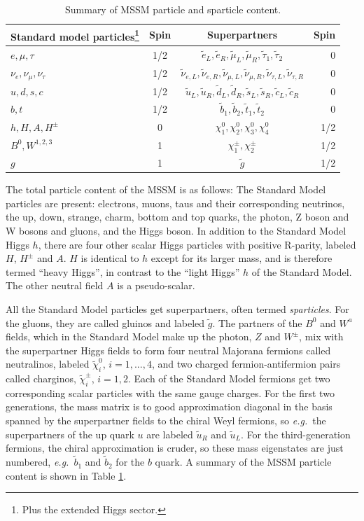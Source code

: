 \documentclass[twoside,english]{uiofysmaster}
\begin{document}
 \begin{table}[hbt]
 \centering
 	\begin{tabular}{|l c  c  r|}
    \hline
 		Standard model particles\footnote{Plus the extended Higgs sector.} & Spin & Superpartners & Spin\\
 		\hline
    \hline
 		$e, \mu, \tau$ & 1/2 & $\tilde e_L, \tilde e_R, \tilde \mu_L, \tilde \mu_R, \tilde \tau_1, \tilde \tau_2$ & 0\\
 		\hline
 		$\nu_e, \nu_\mu, \nu_\tau$ & 1/2 & $\tilde \nu_{e,L}, \tilde \nu_{e,R}, \tilde \nu_{\mu,L}, \tilde \nu_{\mu,R}, \tilde \nu_{\tau,L}, \tilde \nu_{\tau,R}$ & 0\\
 		\hline
 		$u, d, s, c$ & 1/2 & $\tilde u_L, \tilde u_R, \tilde d_L, \tilde d_R, \tilde s_L, \tilde s_R, \tilde c_L, \tilde c_R$ & 0\\
 		\hline
 		$b, t$ & 1/2 & $\tilde b_1, \tilde b_2, \tilde t_1, \tilde t_2$ & 0\\
 		\hline
 		$h, H, A, H^\pm$ & 0 & $\chi_1^0, \chi_2^0, \chi_3^0, \chi_4^0$ & 1/2\\
 		$B^0, W^{1,2,3}$ & 1 & $\chi_1^\pm, \chi_2^\pm$ & 1/2\\
 		\hline
 		$g$ & 1 & $\tilde g$ & 1/2\\
    \hline
 	\end{tabular}
 	\caption{Summary of MSSM particle and sparticle content.}
 	\label{table:MSSM_particles}
 \end{table}
The total particle content of the MSSM is as follows: 
The Standard Model particles are present: electrons, muons, taus and their corresponding neutrinos, the up, down, strange, charm, bottom and top quarks, the photon, Z boson and W bosons and gluons, and the Higgs boson. 
In addition to the Standard Model Higgs $h$, there are four other scalar Higgs particles with positive R-parity, labeled $H$, $H^\pm$ and $A$. $H$ is identical to $h$ except for its larger mass, and is therefore termed ``heavy Higgs'', in contrast to the ``light Higgs'' $h$ of the Standard Model. The other neutral field $A$ is a pseudo-scalar.

All the Standard Model particles get superpartners, often termed {\it sparticles}. For the gluons, they are called gluinos and labeled $\tilde g$. The partners of the $B^0$ and $W^a$ fields, which in the Standard Model make up the photon, $Z$ and $W^\pm$, mix with the superpartner Higgs fields to form four neutral Majorana fermions called neutralinos, labeled $\tilde\chi_i^0$, $i=1,...,4$, and two charged fermion-antifermion pairs called charginos, $\tilde\chi_i^\pm$, $i=1,2$. Each of the Standard Model fermions get two corresponding scalar particles with the same gauge charges. For the first two generations, the mass matrix is to good approximation diagonal in the basis spanned by the superpartner fields to the chiral Weyl fermions, so {\it e.g.}\ the superpartners of the up quark $u$ are labeled $\tilde u_R$ and $\tilde u_L$. For the third-generation fermions, the chiral approximation is cruder, so these mass eigenstates are just numbered, {\it e.g.}\ $\tilde b_1$ and $\tilde b_2$ for the $b$ quark. A summary of the MSSM particle content is shown in Table \ref{table:MSSM_particles}.
\end{document}
